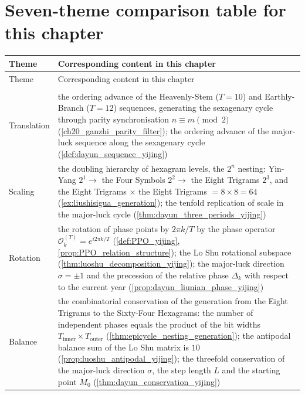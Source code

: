 \section*{Seven-theme comparison table for this chapter}

\begingroup
\renewcommand{\arraystretch}{1.3}
\begin{longtable}{@{}>{\raggedright\arraybackslash}p{3cm}>{\raggedright\arraybackslash}p{\dimexpr\linewidth-3cm-2\tabcolsep\relax}@{}}
\toprule
Theme & Corresponding content in this chapter \\
\midrule
\endfirsthead
\toprule
Theme & Corresponding content in this chapter \\
\midrule
\endhead
\midrule
\multicolumn{2}{r}{\small(continued on the next page)} \\
\endfoot
\bottomrule
\endlastfoot
Translation & the ordering advance of the Heavenly-Stem ($T=10$) and Earthly-Branch ($T=12$) sequences, generating the sexagenary cycle through parity synchronisation $n \equiv m \pmod 2$ (\cref{ch20_ganzhi_parity_filter}); the ordering advance of the major-luck sequence along the sexagenary cycle (\cref{def:dayun_sequence_yijing}) \\
Scaling & the doubling hierarchy of hexagram levels, the $2^n$ nesting: Yin-Yang $2^1 \to$ the Four Symbols $2^2 \to$ the Eight Trigrams $2^3$, and the Eight Trigrams $\times$ the Eight Trigrams $= 8 \times 8 = 64$ (\cref{ex:liushisigua_generation}); the tenfold replication of scale in the major-luck cycle (\cref{thm:dayun_three_periods_yijing}) \\
Rotation & the rotation of phase points by $2\pi k/T$ by the phase operator $\mathcal{O}_k^{(T)} = e^{i2\pi k/T}$ (\cref{def:PPO_yijing}, \cref{prop:PPO_relation_structure}); the Lo Shu rotational subspace (\cref{thm:luoshu_decomposition_yijing}); the major-luck direction $\sigma=\pm 1$ and the precession of the relative phase $\Delta_k$ with respect to the current year (\cref{prop:dayun_liunian_phase_yijing}) \\
Balance & the combinatorial conservation of the generation from the Eight Trigrams to the Sixty-Four Hexagrams: the number of independent phases equals the product of the bit widths $T_{\text{inner}} \times T_{\text{outer}}$ (\cref{thm:epicycle_nesting_generation}); the antipodal balance sum of the Lo Shu matrix is $10$ (\cref{prop:luoshu_antipodal_yijing}); the threefold conservation of the major-luck direction $\sigma$, the step length $L$ and the starting point $M_0$ (\cref{thm:dayun_conservation_yijing}) \\

\end{longtable}
